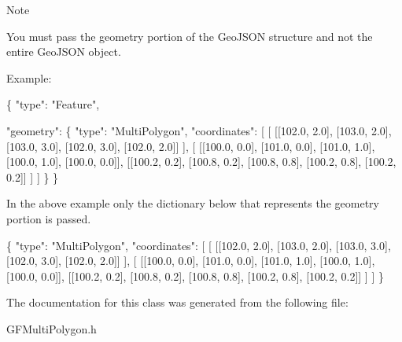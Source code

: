 \begin{DoxyNote}{Note}


You must pass the geometry portion of the Geo\+J\+S\+O\+N structure and not the entire Geo\+J\+S\+O\+N object.

Example\+:


\begin{DoxyCode}
\{
      \textcolor{stringliteral}{"type"}: \textcolor{stringliteral}{"Feature"},

      \textcolor{stringliteral}{"geometry"}: \{
                      \textcolor{stringliteral}{"type"}: \textcolor{stringliteral}{"MultiPolygon"},
                      \textcolor{stringliteral}{"coordinates"}: [
                           [
                              [[102.0, 2.0], [103.0, 2.0], [103.0, 3.0], [102.0, 3.0], [102.0, 2.0]]
                           ],
                           [
                              [[100.0, 0.0], [101.0, 0.0], [101.0, 1.0], [100.0, 1.0], [100.0, 0.0]],
                              [[100.2, 0.2], [100.8, 0.2], [100.8, 0.8], [100.2, 0.8], [100.2, 0.2]]
                           ]
                      ]
                  \}
 \}
\end{DoxyCode}


In the above example only the dictionary below that represents the geometry portion is passed.


\begin{DoxyCode}
 \{
     \textcolor{stringliteral}{"type"}: \textcolor{stringliteral}{"MultiPolygon"},
     \textcolor{stringliteral}{"coordinates"}: [
          [
            [[102.0, 2.0], [103.0, 2.0], [103.0, 3.0], [102.0, 3.0], [102.0, 2.0]]
          ],
          [
            [[100.0, 0.0], [101.0, 0.0], [101.0, 1.0], [100.0, 1.0], [100.0, 0.0]],
            [[100.2, 0.2], [100.8, 0.2], [100.8, 0.8], [100.2, 0.8], [100.2, 0.2]]
          ]
       ]
\}
\end{DoxyCode}
 
\end{DoxyNote}


The documentation for this class was generated from the following file\+:\begin{DoxyCompactItemize}
\item 
G\+F\+Multi\+Polygon.\+h\end{DoxyCompactItemize}
